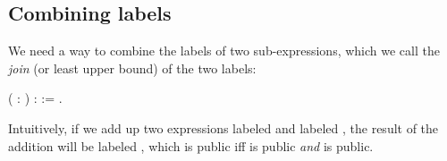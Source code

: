 \documentclass[12pt]{report}
\begin{document}
\subsection{Combining labels}



 We need a way to combine the labels of two sub-expressions, which
    we call the \textit{join} (or least upper bound) of the two labels: 
\begin{coqdoccode}
\coqdocemptyline
\coqdocnoindent
{}  (  : ) :  :=   .\coqdoceol
\coqdocemptyline
\end{coqdoccode}
Intuitively, if we add up two expressions  labeled  and
     labeled , the result of the addition will be labeled
      , which is public iff  is public \textit{and}  is public. 
\end{document}
